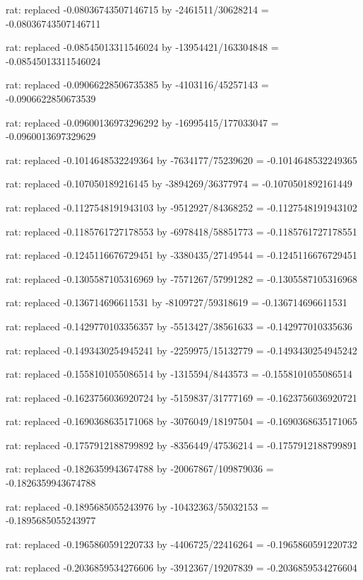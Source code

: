 \documentclass[a4paper,10pt]{article}
\begin{document}
\begin{eulernotebook}
\begin{eulercomment}
\begin{eulercomment}
\begin{eulercomment}
\begin{eulercomment}
\begin{eulercomment}
\begin{eulercomment}
\begin{eulercomment}
\begin{eulercomment}
\begin{eulercomment}
\begin{eulercomment}
\begin{eulercomment}
\begin{eulercomment}
\begin{eulercomment}
\begin{eulercomment}
\begin{eulercomment}
\begin{eulercomment}
\begin{euleroutput}
  rat: replaced -0.08036743507146715 by -2461511/30628214 = -0.08036743507146711
  
  rat: replaced -0.08545013311546024 by -13954421/163304848 = -0.08545013311546024
  
  rat: replaced -0.09066228506735385 by -4103116/45257143 = -0.0906622850673539
  
  rat: replaced -0.09600136973296292 by -16995415/177033047 = -0.0960013697329629
  
  rat: replaced -0.1014648532249364 by -7634177/75239620 = -0.1014648532249365
  
  rat: replaced -0.107050189216145 by -3894269/36377974 = -0.1070501892161449
  
  rat: replaced -0.1127548191943103 by -9512927/84368252 = -0.1127548191943102
  
  rat: replaced -0.1185761727178553 by -6978418/58851773 = -0.1185761727178551
  
  rat: replaced -0.1245116676729451 by -3380435/27149544 = -0.1245116676729451
  
  rat: replaced -0.1305587105316969 by -7571267/57991282 = -0.1305587105316968
  
  rat: replaced -0.136714696611531 by -8109727/59318619 = -0.136714696611531
  
  rat: replaced -0.1429770103356357 by -5513427/38561633 = -0.142977010335636
  
  rat: replaced -0.1493430254945241 by -2259975/15132779 = -0.1493430254945242
  
  rat: replaced -0.1558101055086514 by -1315594/8443573 = -0.1558101055086514
  
  rat: replaced -0.1623756036920724 by -5159837/31777169 = -0.1623756036920721
  
  rat: replaced -0.1690368635171068 by -3076049/18197504 = -0.1690368635171065
  
  rat: replaced -0.1757912188799892 by -8356449/47536214 = -0.1757912188799891
  
  rat: replaced -0.1826359943674788 by -20067867/109879036 = -0.1826359943674788
  
  rat: replaced -0.1895685055243976 by -10432363/55032153 = -0.1895685055243977
  
  rat: replaced -0.1965860591220733 by -4406725/22416264 = -0.1965860591220732
  
  rat: replaced -0.2036859534276606 by -3912367/19207839 = -0.2036859534276604
  

\end{euleroutput}
\end{eulercomment}
\end{eulercomment}
\end{eulercomment}
\end{eulercomment}
\end{eulercomment}
\end{eulercomment}
\end{eulercomment}
\end{eulercomment}
\end{eulercomment}
\end{eulercomment}
\end{eulercomment}
\end{eulercomment}
\end{eulercomment}
\end{eulercomment}
\end{eulercomment}
\end{eulercomment}
\end{eulernotebook}
\end{document}
